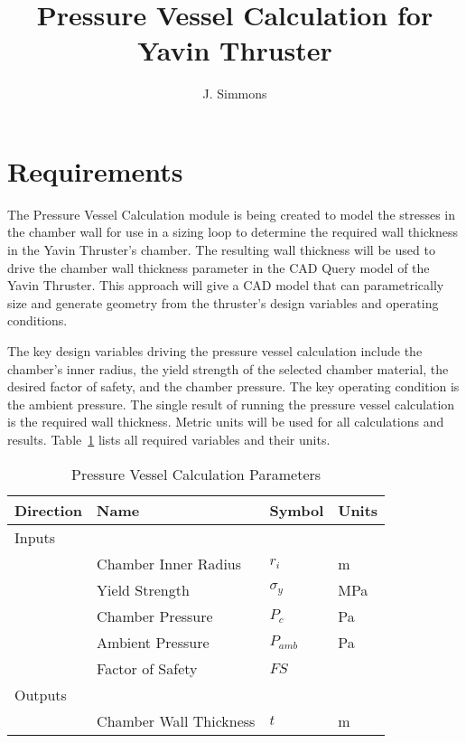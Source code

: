 \documentclass{article}
\title{Pressure Vessel Calculation for Yavin Thruster}
\author{J. Simmons}
\begin{document}
\maketitle

\section{Requirements}
The Pressure Vessel Calculation module is being created to model the stresses in the chamber wall for use in a sizing loop to determine the required wall thickness in the Yavin Thruster's chamber.  The resulting wall thickness will be used to drive the chamber wall thickness parameter in the CAD Query model of the Yavin Thruster.  This approach will give a CAD model that can parametrically size and generate geometry from the thruster's design variables and operating conditions. 

The key design variables driving the pressure vessel calculation include the chamber's inner radius, the yield strength of the selected chamber material, the desired factor of safety, and the chamber pressure.  The key operating condition is the ambient pressure.  The single result of running the pressure vessel calculation is the required wall thickness. Metric units will be used for all calculations and results.  Table~\ref{t:parameters} lists all required variables and their units.

\begin{table}[ht!]%
  \caption{Pressure Vessel Calculation Parameters}
  \centering
  \begin{tabular}{llll}
   Direction & Name & Symbol & Units \\
	\hline\hline
     Inputs & & &\\
     	        & Chamber Inner Radius & $r_i$ & m \\
                & Yield Strength & $\sigma_y$ & MPa \\
                & Chamber Pressure & $P_c$ & Pa \\
                & Ambient Pressure & $P_{amb}$ & Pa \\
                & Factor of Safety & $FS$ & \\
      Outputs & & & \\
                & Chamber Wall Thickness & $t$ & m \\
	\hline
  \end{tabular}
 \label{t:parameters}
\end{table}
\end{document}
